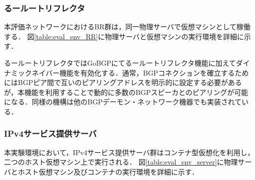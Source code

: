 \subsubsection{るールートリフレクタ}
本評価ネットワークにおけるBR群は，同一物理サーバで仮想マシンとして稼働する．
図\ref{table:eval_env_RR}に物理サーバと仮想マシンの実行環境を詳細に示す．

るールートリフレクタではGoBGPにてるールートリフレクタ機能に加えてダイナミックネイバー機能を有効化する．通常，BGPコネクションを確立するためにはBGPピア間で互いのピアリングアドレスを明示的に設定する必要があるが，本機能を利用することで動的に多数のBGPスピーカとのピアリングが可能になる\cite{GoBGP_dynamic}．同様の機構は他のBGPデーモン・ネットワーク機器でも実装されている\cite{Cisco_dynamic}．


\begin{table}[]
    \label{table:eval_env_RR}
    \caption{評価実験用RR群の実行環境}
\end{table}

\subsubsection{IPv4サービス提供サーバ}
本実験環境において，IPv4サービス提供サーバ群はコンテナ型仮想化\cite{soltesz2007container}を利用し，二つのホスト仮想マシン上で実行される．
図\ref{table:eval_env_server}に物理サーバとホスト仮想マシン及びコンテナの実行環境を詳細に示す．



